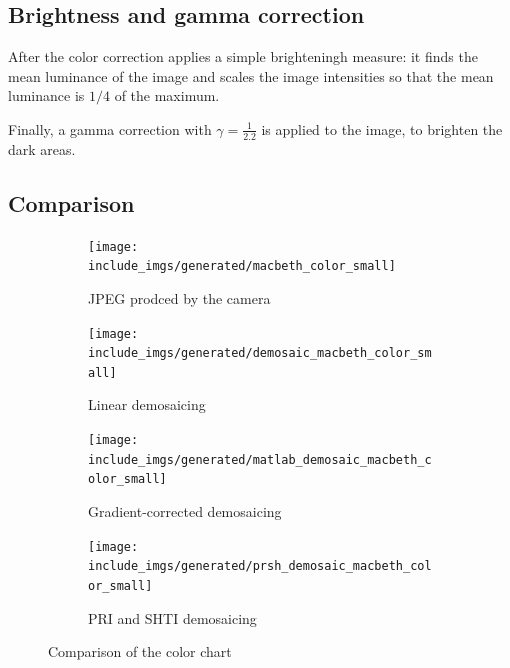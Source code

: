 \documentclass[a4paper,oneside]{article}
\begin{document}
\subsection{Brightness and gamma correction}
After the color correction  applies a simple
brighteningh measure: it finds the mean luminance of the image and
scales the image intensities so that the mean luminance is $1/4$ of
the maximum.

Finally, a gamma correction with $\gamma = \frac{1}{2.2}$ is applied
to the image, to brighten the dark areas.

\subsection{Comparison}
\begin{figure}[htbp]
  \centering
  \begin{subfigure}{.4\textwidth}
    \centering
    \texttt{[image: include\_imgs/generated/macbeth\_color\_small]}
    \caption{JPEG prodced by the camera}
  \end{subfigure}%
  \begin{subfigure}{.4\textwidth}
    \centering
    \texttt{[image: include\_imgs/generated/demosaic\_macbeth\_color\_small]}
    \caption{Linear demosaicing}
  \end{subfigure}
  \begin{subfigure}{.4\textwidth}
    \centering
    \texttt{[image: include\_imgs/generated/matlab\_demosaic\_macbeth\_color\_small]}
    \caption{Gradient-corrected demosaicing}
  \end{subfigure}%
  \begin{subfigure}{.4\textwidth}
    \centering
    \texttt{[image: include\_imgs/generated/prsh\_demosaic\_macbeth\_color\_small]}
    \caption{PRI and SHTI demosaicing}
  \end{subfigure}
  \caption{Comparison of the color chart}
  \label{fig:chart}
\end{figure}
\end{document}
